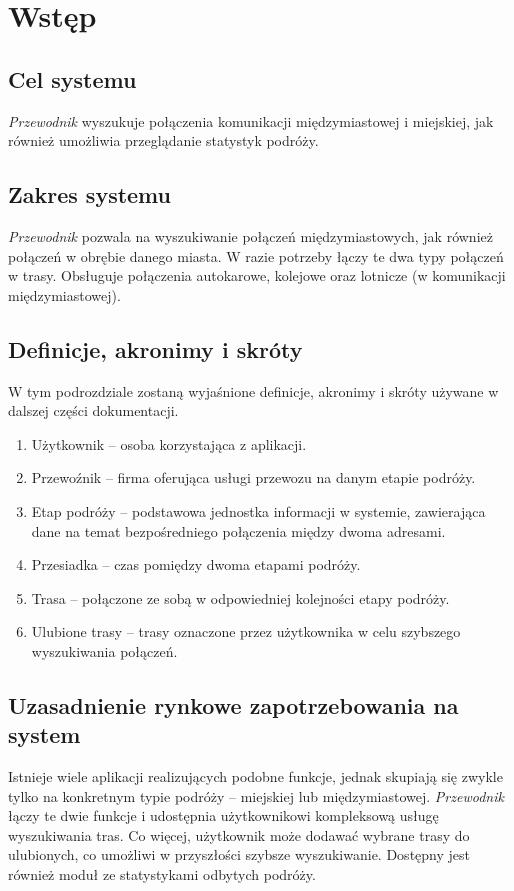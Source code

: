 \documentclass[12pt,a4paper]{report}
\begin{document}
\section{Wstęp}
\subsection{Cel systemu}
	\emph{Przewodnik} wyszukuje połączenia komunikacji międzymiastowej i miejskiej, jak również umożliwia przeglądanie statystyk podróży.
\subsection{Zakres systemu}
	\emph{Przewodnik} pozwala na wyszukiwanie połączeń międzymiastowych, jak również połączeń w obrębie danego miasta. W razie potrzeby łączy te dwa typy połączeń w trasy. Obsługuje połączenia autokarowe, kolejowe oraz lotnicze (w komunikacji międzymiastowej).
\subsection{Definicje, akronimy i skróty}
	W tym podrozdziale zostaną wyjaśnione definicje, akronimy i skróty używane w dalszej części dokumentacji.
\begin{enumerate}
	\item Użytkownik -- osoba korzystająca z aplikacji.
	\item Przewoźnik -- firma oferująca usługi przewozu na danym etapie podróży.
	\item Etap podróży -- podstawowa jednostka informacji w systemie, zawierająca dane na temat bezpośredniego połączenia między dwoma adresami.
	\item Przesiadka -- czas pomiędzy dwoma etapami podróży.
	\item Trasa -- połączone ze sobą w odpowiedniej kolejności etapy podróży.
	\item Ulubione trasy -- trasy oznaczone przez użytkownika w celu szybszego wyszukiwania połączeń.
\end{enumerate}
\subsection{Uzasadnienie rynkowe zapotrzebowania na system}
	Istnieje wiele aplikacji realizujących podobne funkcje, jednak skupiają się zwykle tylko na konkretnym typie podróży -- miejskiej lub międzymiastowej. \emph{Przewodnik} łączy te dwie funkcje i udostępnia użytkownikowi kompleksową usługę wyszukiwania tras. Co więcej, użytkownik może dodawać wybrane trasy do ulubionych, co umożliwi w przyszłości szybsze wyszukiwanie. Dostępny jest również moduł ze statystykami odbytych podróży.
\newpage
\end{document}
